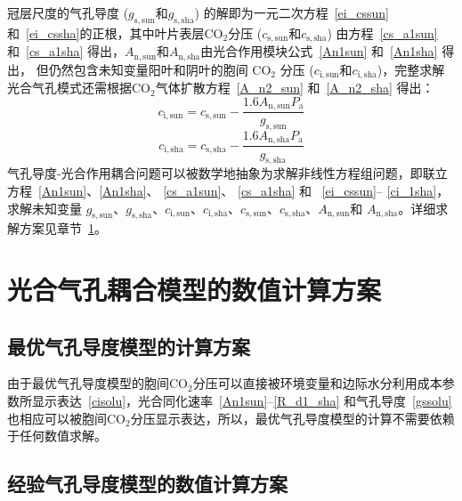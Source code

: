 冠层尺度的气孔导度 ($g_{\mathrm{s,sun}}$和$g_{\mathrm{s,sha}}$) 的解即为一元二次方程~\eqref{ei_cssun} 和~\eqref{ei_cssha}的正根，其中叶片表层$\mathrm{CO_2}$分压 ($c_{\mathrm{s,sun}}$和$c_{\mathrm{s,sha}}$) 由方程~\eqref{cs_a1sun} 和~\eqref{cs_a1sha} 得出，$A_{\mathrm{n,sun}}$和$A_{\mathrm{n,sha}}$由光合作用模块公式~\eqref{An1sun} 和~\eqref{An1sha} 得出，
但仍然包含未知变量阳叶和阴叶的胞间 $\mathrm{CO_2}$ 分压 ($c_{\mathrm{i,sun}}$和$c_{\mathrm{i,sha}}$)，完整求解光合气孔模式还需根据$\mathrm{CO_2}$气体扩散方程~\eqref{A_n2_sun} 和~\eqref{A_n2_sha} 得出：
\begin{equation}\label{ci_1sun}
c_{\mathrm{i,sun}}=c_{\mathrm{s,sun}}-\frac{1.6 A_{\mathrm{n,sun}} P_{\mathrm {a}}}{g_{\mathrm{s,sun}}}
\end{equation}
\begin{equation}\label{ci_1sha}
c_{\mathrm{i,sha}}=c_{\mathrm{s,sha}}-\frac{1.6 A_{\mathrm{n,sha}} P_{\mathrm {a}}}{g_{\mathrm{s,sha}}}
\end{equation}
气孔导度-光合作用耦合问题可以被数学地抽象为求解非线性方程组问题，即联立方程~\eqref{An1sun}、\eqref{An1sha}、 \eqref{cs_a1sun}、 \eqref{cs_a1sha} 和~ \eqref{ei_cssun}--%
\eqref{ci_1sha}，求解未知变量 $g_{\mathrm{s,sun}}$、$g_{\mathrm{s,sha}}$、$c_{\mathrm{i,sun}}$、$c_{\mathrm{i,sha}}$、$c_{\mathrm{s,sun}}$、$c_{\mathrm{s,sha}}$、$A_{\mathrm{n,sun}}$和 $A_{\mathrm{n,sha}}$。详细求解方案见章节~\ref{光合气孔耦合模型的数值计算方案}。


\section{光合气孔耦合模型的数值计算方案}\label{光合气孔耦合模型的数值计算方案}

\subsection{最优气孔导度模型的计算方案}

由于最优气孔导度模型的胞间$\mathrm {CO_2}$分压可以直接被环境变量和边际水分利用成本参数所显示表达~\eqref{cisolu}，光合同化速率~\eqref{An1sun}--\eqref{R_d1_sha} 和气孔导度~\eqref{gssolu} 也相应可以被胞间$\mathrm {CO_2}$分压显示表达，所以，最优气孔导度模型的计算不需要依赖于任何数值求解。

\subsection{经验气孔导度模型的数值计算方案}

